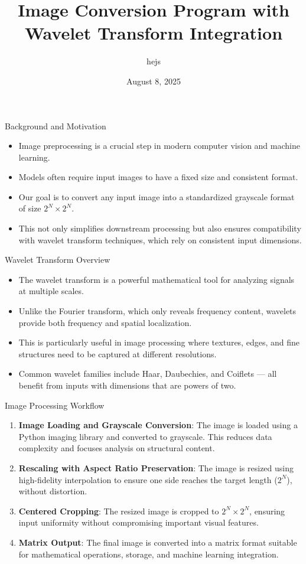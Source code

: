 \documentclass{beamer}
\title{Image Conversion Program with Wavelet Transform Integration}
\author{hejs}
\date{August 8, 2025}
\begin{document}
\frame{\titlepage}

\begin{frame}{Background and Motivation}
\begin{itemize}
    \item Image preprocessing is a crucial step in modern computer vision and machine learning.
    \item Models often require input images to have a fixed size and consistent format.
    \item Our goal is to convert any input image into a standardized grayscale format of size $2^N \times 2^N$.
    \item This not only simplifies downstream processing but also ensures compatibility with wavelet transform techniques, which rely on consistent input dimensions.
\end{itemize}
\end{frame}

\begin{frame}{Wavelet Transform Overview}
\begin{itemize}
    \item The wavelet transform is a powerful mathematical tool for analyzing signals at multiple scales.
    \item Unlike the Fourier transform, which only reveals frequency content, wavelets provide both frequency and spatial localization.
    \item This is particularly useful in image processing where textures, edges, and fine structures need to be captured at different resolutions.
    \item Common wavelet families include Haar, Daubechies, and Coiflets — all benefit from inputs with dimensions that are powers of two.
\end{itemize}
\end{frame}

\begin{frame}{Image Processing Workflow}
\begin{enumerate}
    \item \textbf{Image Loading and Grayscale Conversion}: The image is loaded using a Python imaging library and converted to grayscale. This reduces data complexity and focuses analysis on structural content.
    \item \textbf{Rescaling with Aspect Ratio Preservation}: The image is resized using high-fidelity interpolation to ensure one side reaches the target length ($2^N$), without distortion.
    \item \textbf{Centered Cropping}: The resized image is cropped to $2^N \times 2^N$, ensuring input uniformity without compromising important visual features.
    \item \textbf{Matrix Output}: The final image is converted into a matrix format suitable for mathematical operations, storage, and machine learning integration.
\end{enumerate}
\end{frame}
\end{document}

